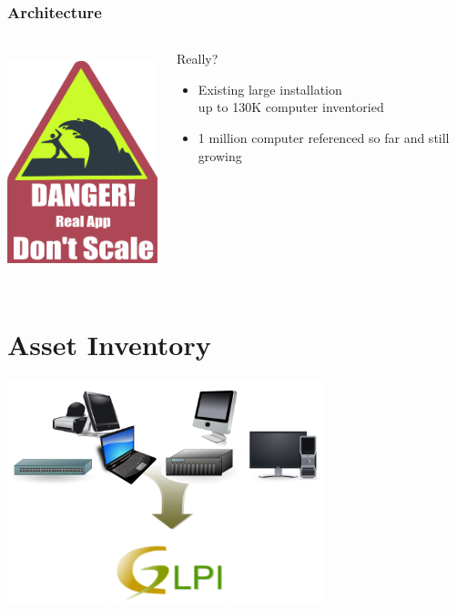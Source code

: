 \documentclass{beamer}
\begin{document}
\begin{frame}
    \frametitle{Architecture}

 \begin{columns}
 \begin{column}{0.34\textwidth}
    \includegraphics[height=6.5cm]{pics/scale.pdf}
 \end{column}
 \begin{column}{0.90\textwidth}
    \begin{block}{Really?}
        \begin{itemize}
            \item Existing large installation \\
            {\small up to 130K computer inventoried}
            \item 1 million computer referenced so far and still growing
        \end{itemize}
    \end{block}

 \end{column}
\end{columns}

\end{frame}


\section{Asset Inventory}

\begin{frame}
\includegraphics[height=6.5cm]{pics/bigpicture.pdf}
\end{frame}
\end{document}

